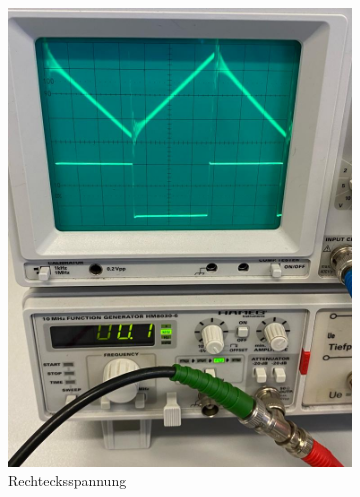 \begin{figure}
    \begin{subfigure}
        \centering
        \includegraphics{Rechtecksspannung.jpg}
        \caption{Rechtecksspannung}
        \label{fig:Rechteck}
    \end{subfigure}
    \begin{subfigure}
        \centering

\end{subfigure}
\end{figure}
